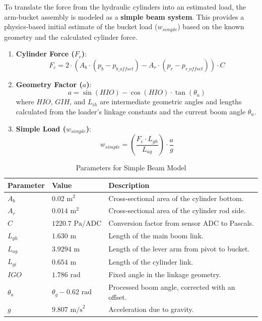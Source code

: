 \documentclass[12pt, a4paper]{article}
\begin{document}
To translate the force from the hydraulic cylinders into an estimated load, the arm-bucket assembly is modeled as a \textbf{simple beam system}. This provides a physics-based initial estimate of the bucket load ($w_{simple}$) based on the known geometry and the calculated cylinder force.

\begin{enumerate}
    \item \textbf{Cylinder Force ($F_c$)}:
    \begin{equation}
        F_c = 2 \cdot (A_b \cdot (p_b - p_{b\_offset}) - A_r \cdot (p_r - p_{r\_offset})) \cdot C
    \end{equation}
    
    \item \textbf{Geometry Factor ($a$)}:
    \begin{equation}
        a = \sin(HIO) - \cos(HIO) \cdot \tan(\theta_a)
    \end{equation}
    where $HIO$, $GIH$, and $L_{ih}$ are intermediate geometric angles and lengths calculated from the loader's linkage constants and the current boom angle $\theta_a$.
    
    \item \textbf{Simple Load ($w_{simple}$)}:
    \begin{equation}
        w_{simple} = \left(\frac{F_c \cdot L_{gh}}{L_{ag}}\right) \cdot \frac{a}{g}
    \end{equation}
\end{enumerate}

\begin{table}[H]
    \centering
    \caption{Parameters for Simple Beam Model}
    \begin{tabular}{l|l|l}
        \hline
        \textbf{Parameter} & \textbf{Value} & \textbf{Description} \\
        \hline
        $A_b$ & $0.02 \text{ m}^2$ & Cross-sectional area of the cylinder bottom. \\
        $A_r$ & $0.014 \text{ m}^2$ & Cross-sectional area of the cylinder rod side. \\
        $C$ & $1220.7 \text{ Pa/ADC}$ & Conversion factor from sensor ADC to Pascals. \\
        $L_{gh}$ & $1.630 \text{ m}$ & Length of the main boom link. \\
        $L_{ag}$ & $3.9294 \text{ m}$ & Length of the lever arm from pivot to bucket. \\
        $L_{gi}$ & $0.654 \text{ m}$ & Length of the cylinder link. \\
        $IGO$ & $1.786 \text{ rad}$ & Fixed angle in the linkage geometry. \\
        $\theta_a$ & $\theta_g - 0.62 \text{ rad}$ & Processed boom angle, corrected with an offset. \\
        $g$ & $9.807 \text{ m/s}^2$ & Acceleration due to gravity. \\
        \hline
    \end{tabular}
\end{table}
\end{document}

